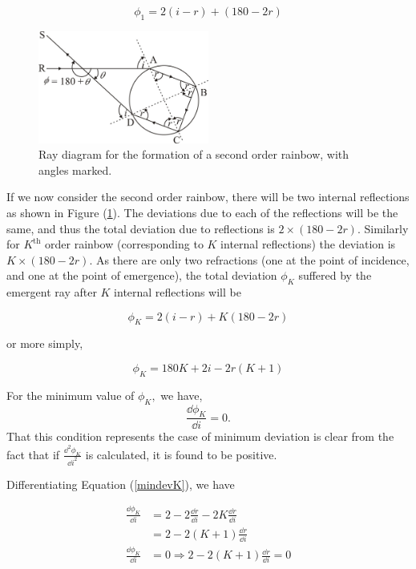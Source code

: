 \begin{equation}
\phi_{1}=2(i-r)+(180-2r)
\end{equation}

\begin{figure}[!htb]
    \centering
    \includegraphics[width=0.5\textwidth]{figs/img4.jpg}
    \caption{Ray diagram for the formation of a second order rainbow, with angles marked.}
    \label{fig:secondorder}
\end{figure}

If we now consider the second order rainbow, there will be two internal reflections as shown in Figure (\ref{fig:secondorder}). The deviations due to each of the reflections will be the same, and thus the total deviation due to reflections is $2\times (180 - 2r)$. Similarly for $K^\text{th}$ order rainbow (corresponding to $K$ internal reflections) the deviation is $K\times(180 - 2r)$. As there are only two refractions (one at the point of incidence, and one at the point of emergence), the total deviation $\phi_K$ suffered by the emergent ray after $K$ internal reflections will be

\begin{equation}
    \phi_K = 2(i-r) + K(180-2r)
\end{equation}

or more simply, 

\begin{equation}
    \phi_K = 180K + 2i - 2r(K+1)
    \label{mindevK}
\end{equation}

For the minimum value of $\phi_K,$ we have, $$\frac{\dd\phi_K}{\dd i}=0.$$ That this condition represents the case of minimum deviation is clear from the fact that if $\frac{\dd^2 \phi_K}{\dd i^2}$ is calculated, it is found to be positive. 

Differentiating Equation (\ref{mindevK}), we have

\begin{equation*}
\begin{aligned}
\frac{\dd\phi_{K}}{\dd i}&=2-2\frac{\dd r}{\dd i}-2K\frac{\dd r}{\dd i}\\
&=2-2(K+1)\frac{\dd r}{\dd i}\\
\frac{\dd \phi_{K}}{\dd i}&=0\Rightarrow2-2(K+1)\frac{\dd r}{\dd i}=0
\end{aligned}
\end{equation*}

